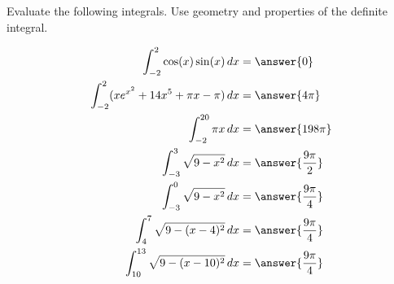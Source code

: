 \documentclass{ximera}
\author{Nela Lakos \and Kyle Parsons}
\begin{document}
\begin{exercise}

Evaluate the following integrals.  Use geometry and properties of the definite integral.

\begin{align*}
\int_{-2}^2 \cos(x)\sin(x) \d x &= \answer{0}\\
\int_{-2}^2 (xe^{x^2} + 14x^5 + \pi x - \pi) \d x &= \answer{4\pi}\\
\int_{-2}^{20} \pi x \d x &= \answer{198\pi}\\
\int_{-3}^3 \sqrt{9-x^2} \d x &= \answer{\frac{9\pi}{2}}\\
\int_{-3}^0 \sqrt{9-x^2} \d x &= \answer{\frac{9\pi}{4}}\\
\int_4^7 \sqrt{9-(x-4)^2} \d x &= \answer{\frac{9\pi}{4}}\\
\int_{10}^{13} \sqrt{9-(x-10)^2} \d x &= \answer{\frac{9\pi}{4}}
\end{align*}

\end{exercise}
\end{document}
